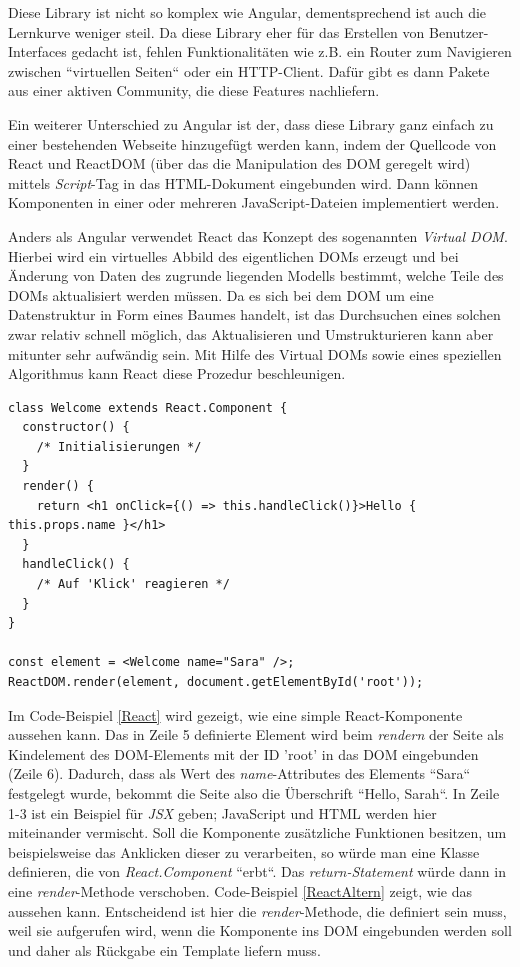 Diese Library ist nicht so komplex wie Angular, dementsprechend ist auch die Lernkurve weniger steil. Da diese Library eher für das Erstellen von Benutzer-Interfaces gedacht ist, fehlen Funktionalitäten wie z.B. ein Router zum Navigieren zwischen ``virtuellen Seiten`` oder ein \acs{HTTP}-Client. Dafür gibt es dann Pakete aus einer aktiven Community, die diese Features nachliefern.

Ein weiterer Unterschied zu Angular ist der, dass diese Library ganz einfach zu einer bestehenden Webseite hinzugefügt werden kann, indem der Quellcode von React und ReactDOM (über das die Manipulation des \acf{DOM} geregelt wird) mittels \textit{Script}-Tag in das \acs{HTML}-Dokument eingebunden wird. Dann können Komponenten in einer oder mehreren JavaScript-Dateien implementiert werden\cite{ReactAdd}.

Anders als Angular verwendet React das Konzept des sogenannten \textit{Virtual \acs{DOM}}. Hierbei wird ein virtuelles Abbild des eigentlichen \acsp{DOM} erzeugt und bei Änderung von Daten des zugrunde liegenden Modells bestimmt, welche Teile des \acsp{DOM} aktualisiert werden müssen. Da es sich bei dem \acs{DOM} um eine Datenstruktur in Form eines Baumes handelt, ist das Durchsuchen eines solchen zwar relativ schnell möglich, das Aktualisieren und Umstrukturieren kann aber mitunter sehr aufwändig sein. Mit Hilfe des Virtual DOMs sowie eines speziellen Algorithmus kann React diese Prozedur beschleunigen\cite{VirtualDom}.

\begin{lstlisting}[float, floatplacement=h, style=htmlcssjs, caption={Code-Beispiel für ein \textit{Class Component} bei React}, label={ReactAltern}]
class Welcome extends React.Component {
  constructor() {
	/* Initialisierungen */  
  }
  render() {
    return <h1 onClick={() => this.handleClick()}>Hello { this.props.name }</h1>
  }
  handleClick() {
    /* Auf 'Klick' reagieren */
  }
}

const element = <Welcome name="Sara" />;
ReactDOM.render(element, document.getElementById('root'));
\end{lstlisting}
Im Code-Beispiel \ref{React} wird gezeigt, wie eine simple React-Komponente aussehen kann\cite{ReactComponent}. Das in Zeile 5 definierte Element wird beim \textit{rendern} der Seite als Kindelement des \acs{DOM}-Elements mit der ID 'root' in das DOM eingebunden (Zeile 6). Dadurch, dass als Wert des \textit{name}-Attributes des Elements ``Sara`` festgelegt wurde, bekommt die Seite also die Überschrift ``Hello, Sarah``. In Zeile 1-3 ist ein Beispiel für \textit{JSX} geben; JavaScript und HTML werden hier miteinander vermischt. Soll die Komponente zusätzliche Funktionen besitzen, um beispielsweise das Anklicken dieser zu verarbeiten, so würde man eine Klasse definieren, die von \textit{React.Component} ``erbt``. Das \textit{return-Statement} würde dann in eine \textit{render}-Methode verschoben. Code-Beispiel \ref{ReactAltern} zeigt, wie das aussehen kann. Entscheidend ist hier die \textit{render}-Methode, die definiert sein muss, weil sie aufgerufen wird, wenn die Komponente ins \acs{DOM} eingebunden werden soll und daher als Rückgabe ein Template liefern muss.


